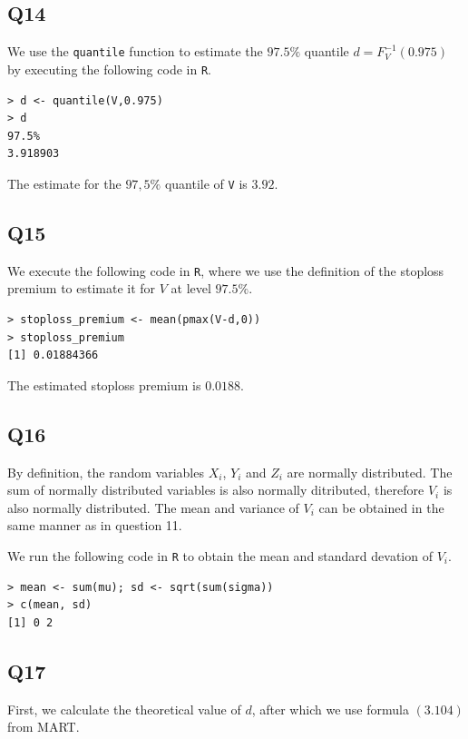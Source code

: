 \subsection*{Q14}

We use the \verb|quantile| function to estimate the $97.5\%$ quantile $d = F^{-1}_{V}(0.975)$ by executing the following code in \verb|R|.

\begin{verbatim}
> d <- quantile(V,0.975)
> d
97.5% 
3.918903 
\end{verbatim}

The estimate for the $97,5\%$ quantile of \verb|V| is $3.92$.

\subsection*{Q15}

We execute the following code in \verb|R|, where we use the definition of the stoploss premium to estimate it for $V$ at level $97.5\%$.

\begin{verbatim}
> stoploss_premium <- mean(pmax(V-d,0)) 
> stoploss_premium
[1] 0.01884366
\end{verbatim}

The estimated stoploss premium is $0.0188$.

\subsection*{Q16}

By definition, the random variables $X_i$, $Y_i$ and $Z_i$ are normally distributed. The sum of normally distributed variables is also normally ditributed, therefore $V_i$ is also normally distributed. The mean and variance of $V_i$ can be obtained in the same manner as in question 11.

We run the following code in \verb|R| to obtain the mean and standard devation of $V_i$.

\begin{verbatim}
> mean <- sum(mu); sd <- sqrt(sum(sigma))
> c(mean, sd)
[1] 0 2
\end{verbatim}

\subsection*{Q17}

First, we calculate the theoretical value of $d$, after which we use formula $(3.104)$ from MART.

